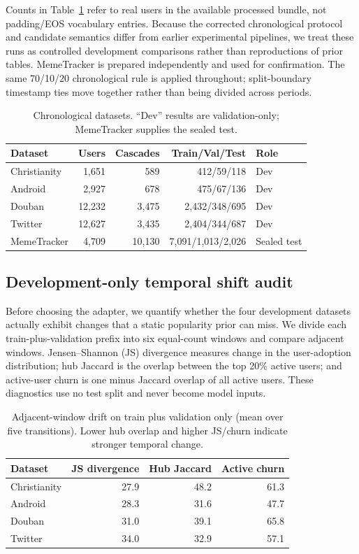 \documentclass[sigconf,anonymous,review]{acmart}
\begin{document}
Counts in Table~\ref{tab:data} refer to real users in the available processed bundle, not padding/EOS vocabulary entries. Because the corrected chronological protocol and candidate semantics differ from earlier experimental pipelines, we treat these runs as controlled development comparisons rather than reproductions of prior tables. MemeTracker is prepared independently and used for confirmation. The same 70/10/20 chronological rule is applied throughout; split-boundary timestamp ties move together rather than being divided across periods.

\begin{table}[t]
\caption{Chronological datasets. ``Dev'' results are validation-only; MemeTracker supplies the sealed test.}
\label{tab:data}
\centering
\small
\begin{tabular}{lrrrl}
\toprule
Dataset & Users & Cascades & Train/Val/Test & Role\\
\midrule
Christianity & 1,651 & 589 & 412/59/118 & Dev\\
Android & 2,927 & 678 & 475/67/136 & Dev\\
Douban & 12,232 & 3,475 & 2,432/348/695 & Dev\\
Twitter & 12,627 & 3,435 & 2,404/344/687 & Dev\\
MemeTracker & 4,709 & 10,130 & 7,091/1,013/2,026 & Sealed test\\
\bottomrule
\end{tabular}
\end{table}

\subsection{Development-only temporal shift audit}
Before choosing the adapter, we quantify whether the four development datasets actually exhibit changes that a static popularity prior can miss. We divide each train-plus-validation prefix into six equal-count windows and compare adjacent windows. Jensen--Shannon (JS) divergence measures change in the user-adoption distribution; hub Jaccard is the overlap between the top 20\% active users; and active-user churn is one minus Jaccard overlap of all active users. These diagnostics use no test split and never become model inputs.

\begin{table}[t]
\caption{Adjacent-window drift on train plus validation only (mean over five transitions). Lower hub overlap and higher JS/churn indicate stronger temporal change.}
\label{tab:drift}
\centering
\small
\begin{tabular}{lrrr}
\toprule
Dataset & JS divergence & Hub Jaccard & Active churn\\
\midrule
Christianity & 27.9 & 48.2 & 61.3\\
Android & 28.3 & 31.6 & 47.7\\
Douban & 31.0 & 39.1 & 65.8\\
Twitter & 34.0 & 32.9 & 57.1\\
\bottomrule
\end{tabular}
\end{table}
\end{document}
